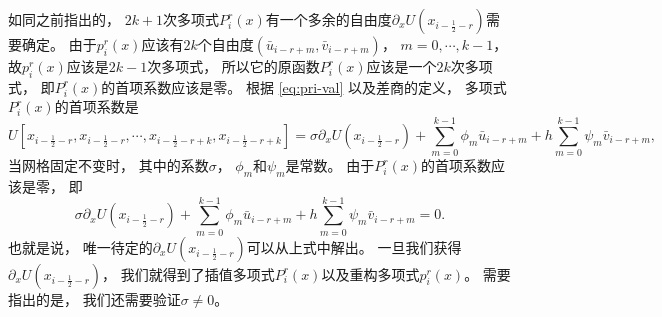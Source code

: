 如同之前指出的，
$2k + 1$次多项式$P^r_i(x)$有一个多余的自由度${\partial_x}U(x_{i-\frac 12-r})$需要确定。
由于$p^r_i(x)$应该有$2k$个自由度$(\bar u_{i-r+m},\bar v_{i-r+m})$，
$m=0,\cdots, k-1$，
故$p^r_i(x)$应该是$2k-1$次多项式，
所以它的原函数$P^r_i(x)$应该是一个$2k$次多项式，
即$P^r_i(x)$的首项系数应该是零。
根据 \cref{eq:pri-val} 以及差商的定义，
多项式$P^r_i(x)$的首项系数是
\begin{equation}
  \label{eq:1Drec-leadingterm}
  U\left[x_{i-\frac 12-r}, x_{i-\frac 12-r}, \cdots, x_{i-\frac 12-r+k}, x_{i-\frac 12-r+k}\right]
  =\sigma {\partial_x}U(x_{i-\frac 12-r})+\sum_{m=0}^{k-1} \phi_{m} \bar{u}_{i-r+m}+ h \sum_{m=0}^{k-1} \psi_{m} \bar v_{i-r+m},
\end{equation}
当网格固定不变时，
其中的系数$\sigma$，
$\phi_m$和$\psi_m$是常数。
由于$P^r_i(x)$的首项系数应该是零，
即
\begin{equation}
  \label{eq:sigma_cal}
  \sigma {\partial_x}U(x_{i-\frac 12-r})+\sum_{m=0}^{k-1} \phi_{m} \bar{u}_{i-r+m}+h\sum_{m=0}^{k-1} \psi_{m} \bar v_{i-r+m} = 0.
\end{equation}
也就是说，
唯一待定的${\partial_x}U(x_{i-\frac 12-r})$可以从上式中解出。
一旦我们获得${\partial_x}U(x_{i-\frac 12-r})$，
我们就得到了插值多项式$P^r_i(x)$以及重构多项式$p^r_i(x)$。
需要指出的是，
我们还需要验证$\sigma\neq0$。

